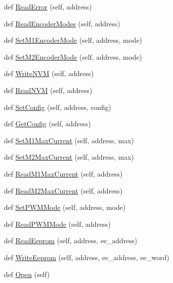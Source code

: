 \begin{DoxyCompactItemize}
\item 
def \mbox{\hyperlink{classtoxic__hardware_1_1roboclaw__3_1_1Roboclaw_a72e3c01c236d0507a5bbe51dbc4cab7c}{Read\+Error}} (self, address)
\item 
def \mbox{\hyperlink{classtoxic__hardware_1_1roboclaw__3_1_1Roboclaw_a1cef86af310cc021bdf421bd4d02adf3}{Read\+Encoder\+Modes}} (self, address)
\item 
def \mbox{\hyperlink{classtoxic__hardware_1_1roboclaw__3_1_1Roboclaw_ac32404cfafd3dd0c49983b724717945b}{Set\+M1\+Encoder\+Mode}} (self, address, mode)
\item 
def \mbox{\hyperlink{classtoxic__hardware_1_1roboclaw__3_1_1Roboclaw_abc897b52a6653ae79b5c7c193a88345c}{Set\+M2\+Encoder\+Mode}} (self, address, mode)
\item 
def \mbox{\hyperlink{classtoxic__hardware_1_1roboclaw__3_1_1Roboclaw_ab727e2cb1e1d5962f9d52c7af8524ede}{Write\+N\+VM}} (self, address)
\item 
def \mbox{\hyperlink{classtoxic__hardware_1_1roboclaw__3_1_1Roboclaw_a9758a592cc718d5ccc89d45e785d9662}{Read\+N\+VM}} (self, address)
\item 
def \mbox{\hyperlink{classtoxic__hardware_1_1roboclaw__3_1_1Roboclaw_a28cd21a66d7035f83fc68d761c630a85}{Set\+Config}} (self, address, config)
\item 
def \mbox{\hyperlink{classtoxic__hardware_1_1roboclaw__3_1_1Roboclaw_afc1b66a8f32fe623ab34d0fdfef9186c}{Get\+Config}} (self, address)
\item 
def \mbox{\hyperlink{classtoxic__hardware_1_1roboclaw__3_1_1Roboclaw_a753f6a7ecb157eb9cdaf3a6f4b83fb93}{Set\+M1\+Max\+Current}} (self, address, max)
\item 
def \mbox{\hyperlink{classtoxic__hardware_1_1roboclaw__3_1_1Roboclaw_a863297bf33c9dcec1d3c73c835a3d18d}{Set\+M2\+Max\+Current}} (self, address, max)
\item 
def \mbox{\hyperlink{classtoxic__hardware_1_1roboclaw__3_1_1Roboclaw_a9893d61828707709b8e6808729feca96}{Read\+M1\+Max\+Current}} (self, address)
\item 
def \mbox{\hyperlink{classtoxic__hardware_1_1roboclaw__3_1_1Roboclaw_a47f42d6846681c541c4f609d91020238}{Read\+M2\+Max\+Current}} (self, address)
\item 
def \mbox{\hyperlink{classtoxic__hardware_1_1roboclaw__3_1_1Roboclaw_aadb6c9818880f6971fe75cb9bdaeeac1}{Set\+P\+W\+M\+Mode}} (self, address, mode)
\item 
def \mbox{\hyperlink{classtoxic__hardware_1_1roboclaw__3_1_1Roboclaw_a3d8822116c10f298f220bcf6bff9ef82}{Read\+P\+W\+M\+Mode}} (self, address)
\item 
def \mbox{\hyperlink{classtoxic__hardware_1_1roboclaw__3_1_1Roboclaw_a3a5b1ed034fb270714ac6a8e05d02cfa}{Read\+Eeprom}} (self, address, ee\+\_\+address)
\item 
def \mbox{\hyperlink{classtoxic__hardware_1_1roboclaw__3_1_1Roboclaw_a6e8d1950fa135f3841c1aed277643c2e}{Write\+Eeprom}} (self, address, ee\+\_\+address, ee\+\_\+word)
\item 
def \mbox{\hyperlink{classtoxic__hardware_1_1roboclaw__3_1_1Roboclaw_aae16cc4d3c7c4ec0126729d49ebb92cb}{Open}} (self)
\end{DoxyCompactItemize}
